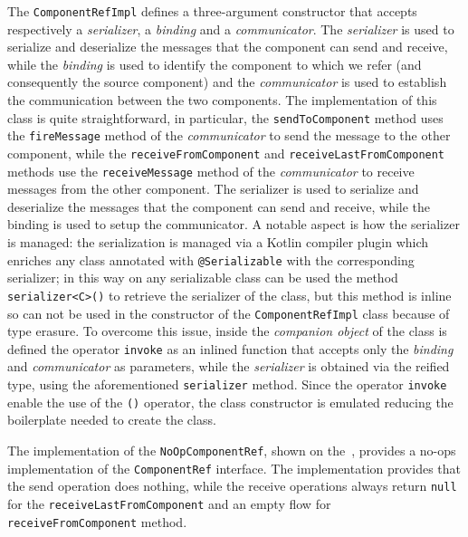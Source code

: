 The \texttt{ComponentRefImpl} defines a three-argument constructor that accepts respectively a \emph{serializer}, a \emph{binding} and a
\emph{communicator}. The \emph{serializer} is used to serialize and deserialize the messages that the component can send and receive, while the
\emph{binding} is used to identify the component to which we refer (and consequently the source component) and the \emph{communicator} is used to
establish the communication between the two components.
The implementation of this class is quite straightforward, in particular, the \texttt{sendToComponent} method uses the \texttt{fireMessage} method of
the \emph{communicator} to send the message to the other component, while the \texttt{receiveFromComponent} and \texttt{receiveLastFromComponent}
methods use the \texttt{receiveMessage} method of the \emph{communicator} to receive messages from the other component.
The serializer is used to serialize and deserialize the messages that the component can send and receive, while the binding is used to
setup the communicator.
A notable aspect is how the serializer is managed: the serialization is managed via a Kotlin compiler plugin which enriches any class annotated with
\texttt{@Serializable} with the corresponding serializer; in this way on any serializable class can be used the method \texttt{serializer<C>()} to
retrieve the serializer of the class, but this method is inline so can not be used in the constructor of the \texttt{ComponentRefImpl} class because of
type erasure.
To overcome this issue, inside the \emph{companion object} of the class is defined the operator \texttt{invoke} as an inlined function that
accepts only the \emph{binding} and \emph{communicator} as parameters, while the \emph{serializer} is obtained via the reified type, using the
aforementioned \texttt{serializer} method. Since the operator \texttt{invoke} enable the use of the \texttt{()} operator, the class constructor is
emulated reducing the boilerplate needed to create the class.



The implementation of the \texttt{NoOpComponentRef}, shown on the~, provides a no-ops implementation of the
\texttt{ComponentRef} interface. The implementation provides that the send operation does nothing, while the receive operations always return
\texttt{null} for the \texttt{receiveLastFromComponent} and an empty flow for \texttt{receiveFromComponent} method.

